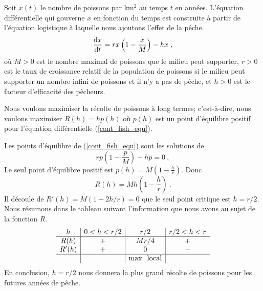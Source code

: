 {\begin{egg}[\life]
Soit $x(t)$ le nombre de poissons par km$^2$ au temps $t$ en
années.  L'équation différentielle qui gouverne $x$ en fonction du
temps est construite à partir de l'équation logistique à laquelle nous
ajoutons l'effet de la pêche.
\begin{equation} \label{cont_fish_equ}
\frac{\mathrm{d}x}{\mathrm{d}t} = r x\left(1-\frac{x}{M}\right) - h x \ ,
\end{equation}
où $M>0$ est le nombre maximal de poissons que le milieu peut
supporter, $r>0$ est le taux de croissance relatif de la population de
poissons si le milieu peut supporter un nombre infini de poissons et
il n'y a pas de pêche, et $h>0$ est le facteur d'efficacité des
pêcheurs.

Nous voulons maximiser la récolte de poissons à long termes; c'est-à-dire,
nous voulons maximiser $R(h) = h p(h)$ où $p(h)$ est un point d'équilibre
positif pour l'équation différentielle (\ref{cont_fish_equ}).

Les points d'équilibre de (\ref{cont_fish_equ}) sont les solutions de
\[
r p\left(1-\frac{p}{M}\right) - h p = 0 \ ,
\]
Le seul point d'équilibre positif est
$\displaystyle p(h) = M \left( 1 - \frac{h}{r}\right)$.  Donc
\[
R(h) = M h \left( 1 - \frac{h}{r}\right) \ .
\]
Il découle de $R'(h) = M(1-2h/r) = 0$ que le seul point critique est
$h = r/2$.  Nous résumons dans le tableau suivant l'information que nous
avons au sujet de la fonction $R$.
\[
\begin{array}{c|c|c|c}
h & 0 < h < r/2 & r/2 & r/2 < h < r \\
\hline
R(h) & + & Mr/4 & + \\
R'(h) & + & 0 & - \\
\hline
 & & \text{max. local} &
\end{array}
\]
En conclusion, $h=r/2$ nous donnera la plus grand récolte de poissons
pour les futures années de pêche.
\label{continuous_fish_probl}
\end{egg}

}
